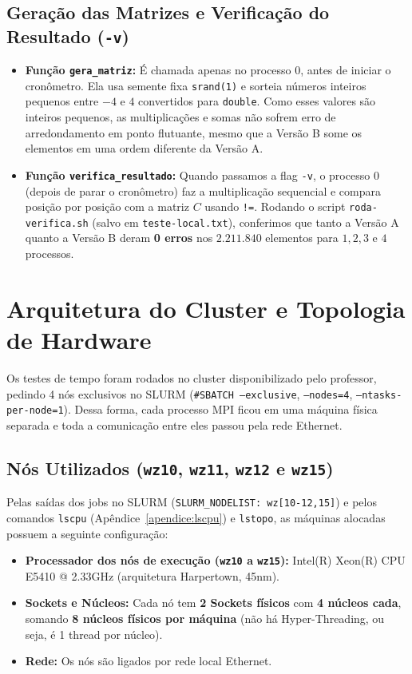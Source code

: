 \documentclass[12pt, a4paper, twoside, chapter=TITLE, subsection=TITLE, section=TITLE, subsubsection=TITLE, english, brazil]{abntex2}
\begin{document}
\section{Geração das Matrizes e Verificação do Resultado (\texttt{-v})}
\begin{itemize}
    \item \textbf{Função \nolinkurl{gera_matriz}:} É chamada apenas no processo 0, antes de iniciar o cronômetro. Ela usa semente fixa \texttt{srand(1)} e sorteia números inteiros pequenos entre $-4$ e $4$ convertidos para \texttt{double}. Como esses valores são inteiros pequenos, as multiplicações e somas não sofrem erro de arredondamento em ponto flutuante, mesmo que a Versão B some os elementos em uma ordem diferente da Versão A.
    \item \textbf{Função \nolinkurl{verifica_resultado}:} Quando passamos a flag \texttt{-v}, o processo 0 (depois de parar o cronômetro) faz a multiplicação sequencial e compara posição por posição com a matriz $C$ usando \texttt{!=}. Rodando o script \nolinkurl{roda-verifica.sh} (salvo em \nolinkurl{teste-local.txt}), conferimos que tanto a Versão A quanto a Versão B deram \textbf{0 erros} nos $2.211.840$ elementos para $1, 2, 3$ e $4$ processos.
\end{itemize}

\chapter{Arquitetura do Cluster e Topologia de Hardware}

Os testes de tempo foram rodados no cluster disponibilizado pelo professor, pedindo 4 nós exclusivos no SLURM (\texttt{\#SBATCH --exclusive}, \texttt{--nodes=4}, \texttt{--ntasks-per-node=1}). Dessa forma, cada processo MPI ficou em uma máquina física separada e toda a comunicação entre eles passou pela rede Ethernet.

\section{Nós Utilizados (\texttt{wz10}, \texttt{wz11}, \texttt{wz12} e \texttt{wz15})}
Pelas saídas dos jobs no SLURM (\texttt{SLURM\_NODELIST: wz[10-12,15]}) e pelos comandos \texttt{lscpu} (Apêndice~\ref{apendice:lscpu}) e \texttt{lstopo}, as máquinas alocadas possuem a seguinte configuração:
\begin{itemize}
    \item \textbf{Processador dos nós de execução (\texttt{wz10} a \texttt{wz15}):} Intel(R) Xeon(R) CPU E5410 @ 2.33GHz (arquitetura Harpertown, 45nm).
    \item \textbf{Sockets e Núcleos:} Cada nó tem \textbf{2 Sockets físicos} com \textbf{4 núcleos cada}, somando \textbf{8 núcleos físicos por máquina} (não há Hyper-Threading, ou seja, é 1 thread por núcleo).
    \item \textbf{Rede:} Os nós são ligados por rede local Ethernet.
\end{itemize}
\end{document}
